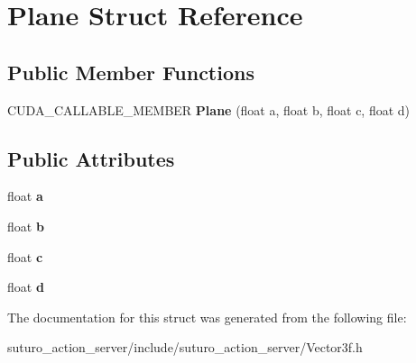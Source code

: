 \hypertarget{structPlane}{\section{Plane Struct Reference}
\label{structPlane}
}
\subsection*{Public Member Functions}
\begin{DoxyCompactItemize}
\item 
\hypertarget{structPlane_ae65b04b0d77541b64d73f4528abc8afd}{C\-U\-D\-A\-\_\-\-C\-A\-L\-L\-A\-B\-L\-E\-\_\-\-M\-E\-M\-B\-E\-R {\bfseries Plane} (float a, float b, float c, float d)}\label{structPlane_ae65b04b0d77541b64d73f4528abc8afd}

\end{DoxyCompactItemize}
\subsection*{Public Attributes}
\begin{DoxyCompactItemize}
\item 
\hypertarget{structPlane_a818b693ba813d53949e18aa1416cc12a}{float {\bfseries a}}\label{structPlane_a818b693ba813d53949e18aa1416cc12a}

\item 
\hypertarget{structPlane_a3d802fea10cfe6352e1792733d793b14}{float {\bfseries b}}\label{structPlane_a3d802fea10cfe6352e1792733d793b14}

\item 
\hypertarget{structPlane_aec04c57607ffa16c210f955360ef4153}{float {\bfseries c}}\label{structPlane_aec04c57607ffa16c210f955360ef4153}

\item 
\hypertarget{structPlane_a61fc789fce8fbe72914f5397f1bbed44}{float {\bfseries d}}\label{structPlane_a61fc789fce8fbe72914f5397f1bbed44}

\end{DoxyCompactItemize}


The documentation for this struct was generated from the following file\-:\begin{DoxyCompactItemize}
\item 
suturo\-\_\-action\-\_\-server/include/suturo\-\_\-action\-\_\-server/Vector3f.\-h\end{DoxyCompactItemize}
